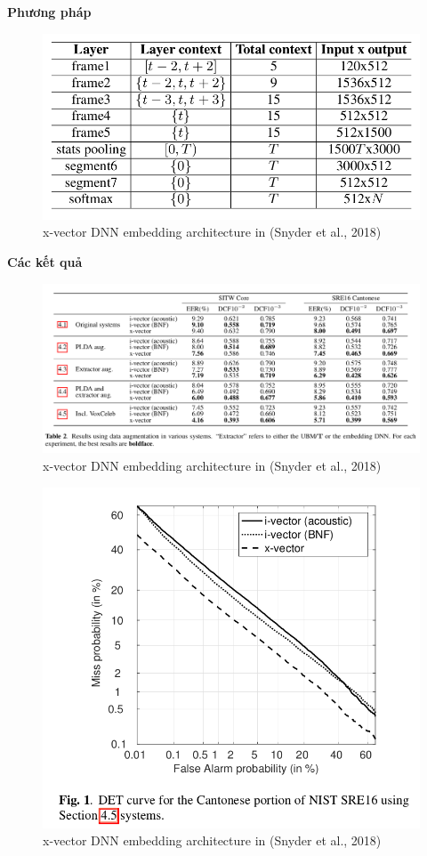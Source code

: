 \documentclass{article}
\begin{document}
	\textbf{Phương pháp}
	\begin{figure}[H]
		\centering
		\includegraphics[width=0.75\linewidth]{images/x-vectors-setup.png}
		\caption{x-vector DNN embedding architecture in (Snyder et al., 2018)}
		\label{fig:writing-thesis}
	\end{figure}
	\textbf{Các kết quả}
	\begin{figure}[H]
		\centering
		\includegraphics[width=1\linewidth]{images/x-vectors-result-table-02.png}
		\caption{x-vector DNN embedding architecture in (Snyder et al., 2018)}
		\label{fig:writing-thesis}
	\end{figure}
	\begin{figure}[H]
		\centering
		\includegraphics[width=0.75\linewidth]{images/x-vectors-fig-01.png}
		\caption{x-vector DNN embedding architecture in (Snyder et al., 2018)}
		\label{fig:writing-thesis}
	\end{figure}
\end{document}
